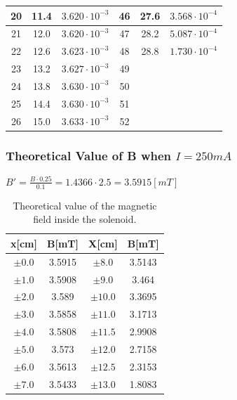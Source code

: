 \documentclass[12pt]{article}
\begin{document}
\begin{table}[H]
\begin{tabular}{|c|c|c||c|c|c|}
20 & 11.4 &$3.620\cdot10^{-3}$ &46 &27.6 &$3.568\cdot10^{-4}$  \\ \hline
21 & 12.0 &$3.620\cdot10^{-3}$  &47 &28.2  &$5.087\cdot10^{-4}$  \\ \hline
22 & 12.6 &$3.623\cdot10^{-3}$  &48 &28.8  &$1.730\cdot10^{-4}$  \\ \hline
23 & 13.2 &$3.627\cdot10^{-3}$  &49 &  &  \\ \hline
24 & 13.8 &$3.630\cdot10^{-3}$  &50 &  &  \\ \hline
25 & 14.4 &$3.630\cdot10^{-3}$  &51 &  &  \\ \hline
26 & 15.0 &$3.633\cdot10^{-3}$  &52 &  &  \\ \hline
\end{tabular}
\end{table}
\subsubsection{Theoretical Value of B when $I=250mA$ }
$B'=\frac{B\cdot0.25}{0.1}=1.4366\cdot2.5=3.5915[mT]$
\begin{table}[H]
\centering
\begin{tabular}{|c|c|c|c|}
\hline
x[cm] & B[mT]  & X[cm] & B[mT]  \\ \hline
$\pm0.0$   	  & 3.5915 &$\pm8.0$       & 3.5143 \\ \hline
$\pm1.0$ 	  & 3.5908 &$\pm9.0$       & 3.464 \\ \hline
$\pm2.0$      & 3.589 &$\pm10.0$       & 3.3695 \\ \hline
$\pm3.0$      & 3.5858 &$\pm11.0$       & 3.1713 \\ \hline
$\pm4.0$      & 3.5808 &$\pm11.5$       & 2.9908 \\ \hline
$\pm5.0$      & 3.573 &$\pm12.0$      & 2.7158 \\ \hline
$\pm6.0$      & 3.5613 &$\pm12.5$       & 2.3153 \\ \hline
$\pm7.0$      & 3.5433 &$\pm13.0$       & 1.8083 \\ \hline
\end{tabular}
\caption{Theoretical value of the magnetic field inside the solenoid.}
\end{table}
\end{document}
